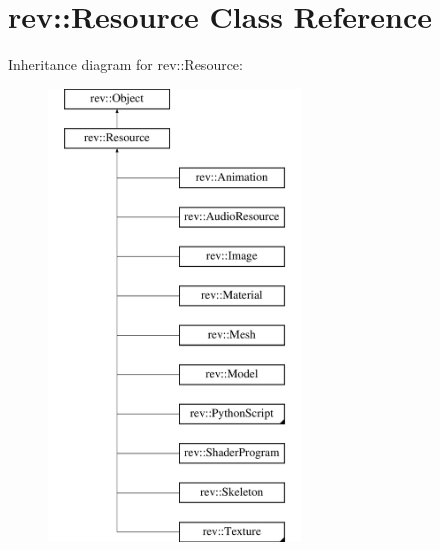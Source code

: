 \hypertarget{classrev_1_1_resource}{}\section{rev\+::Resource Class Reference}
\label{classrev_1_1_resource}
Inheritance diagram for rev\+::Resource\+:\begin{figure}[H]
\begin{center}
\leavevmode
\includegraphics[height=12.000000cm]{classrev_1_1_resource}
\end{center}
\end{figure}
